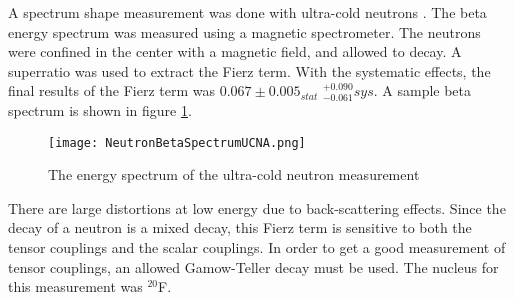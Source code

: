 \documentclass[../MaxHughesThesis.tex]{subfiles}
\begin{document}
A spectrum shape measurement was done with ultra-cold neutrons \cite{Hic17}.
The beta energy spectrum was measured using a magnetic spectrometer.
The neutrons were confined in the center with a magnetic field, and allowed to decay.
A superratio was used to extract the Fierz term.
With the systematic effects, the final results of the Fierz term was $0.067 \pm 0.005_{stat}$ $ ^{+0.090}_{-0.061} sys$.
A sample beta spectrum is shown in figure \ref{fig:ucnabeta}.

\begin{figure}[!htb]
        \centerline{\texttt{[image: NeutronBetaSpectrumUCNA.png]}}
        \caption{The energy spectrum of the ultra-cold neutron measurement \cite{Hic17}}
        \label{fig:ucnabeta}
\end{figure}

There are large distortions at low energy due to back-scattering effects.
Since the decay of a neutron is a mixed decay, this Fierz term is sensitive to both the tensor couplings and the scalar couplings.
In order to get a good measurement of  tensor couplings, an allowed Gamow-Teller decay must be used. 
The nucleus for this measurement was $^{20}$F.
\end{document}
